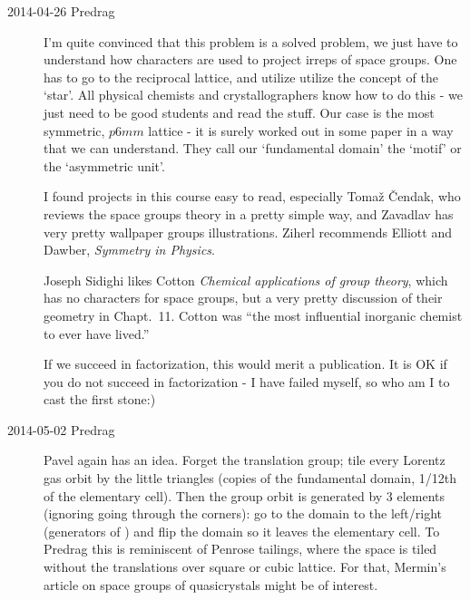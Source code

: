 \begin{description}
\item[2014-04-26 Predrag]
I'm quite convinced that this problem is a solved problem, we just have
to understand how characters are used to project irreps of space groups.
One has to go to the reciprocal lattice, and utilize utilize the concept
of the `star'. All physical chemists and crystallographers know how to do
this - we just need to be good students and read the stuff. Our case is
the most symmetric, $p6mm$ lattice - it is surely worked out in some
paper in a way that we can understand. They call our `fundamental domain'
the `motif' or the `asymmetric unit'.

I found projects in  {this
course} easy to read, especially Toma\v{z} \v{C}endak, who reviews the
space groups theory in a pretty simple way, and Zavadlav has very pretty
wallpaper groups illustrations. Ziherl recommends Elliott and  Dawber,
{\em Symmetry in Physics}.

Joseph Sidighi likes Cotton {\em Chemical applications of
group theory}, which has no characters for space groups, but a very
pretty discussion of their geometry in Chapt.~11. Cotton was ``the most
influential inorganic chemist to ever have lived.''

If we succeed in factorization, this would merit a publication.
It is OK if you do not succeed in factorization - I have failed myself, so
who am I to cast the first stone:)

\item[2014-05-02 Predrag]
Pavel again has an idea. Forget the translation group; tile every Lorentz
gas orbit by the little triangles (copies of the fundamental domain,
1/12th of the elementary cell). Then the group orbit is generated by 3
elements (ignoring going through the corners): go to the domain to the
left/right (generators of ) and flip the domain so it leaves the
elementary cell. To Predrag this is reminiscent of Penrose tailings,
where the space is tiled without the translations over square or cubic
lattice. For that, Mermin's article on space groups of
quasicrystals might be of interest.


\end{description}
